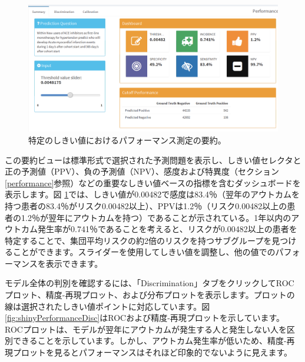 \documentclass[
  11pt]{book}
\theoremstyle{definition}
\theoremstyle{definition}
\theoremstyle{definition}
\theoremstyle{definition}
\theoremstyle{remark}
\begin{document}
\begin{figure}

{\centering \includegraphics[width=1\linewidth]{images/PatientLevelPrediction/shiny/shinyPerformanceSum} 

}

\caption{特定のしきい値におけるパフォーマンス測定の要約。}\label{fig:shinyPerformanceSum}
\end{figure}

この要約ビューは標準形式で選択された予測問題を表示し、しきい値セレクタと正の予測値（PPV）、負の予測値（NPV）、感度および特異度（セクション \ref{performance}参照）などの重要なしきい値ベースの指標を含むダッシュボードを表示します。図 \ref{fig:shinyPerformanceSum}では、しきい値が0.00482で感度は83.4％（翌年のアウトカムを持つ患者の83.4％がリスク0.00482以上）、PPVは1.2％（リスク0.00482以上の患者の1.2％が翌年にアウトカムを持つ）であることが示されている。1年以内のアウトカム発生率が0.741％であることを考えると、リスクが0.00482以上の患者を特定することで、集団平均リスクの約2倍のリスクを持つサブグループを見つけることができます。スライダーを使用してしきい値を調整し、他の値でのパフォーマンスを表示できます。

モデル全体の判別を確認するには、「Discrimination」タブをクリックしてROCプロット、精度-再現プロット、および分布プロットを表示します。プロットの線は選択されたしきい値ポイントに対応しています。図 \ref{fig:shinyPerformanceDisc}はROCおよび精度-再現プロットを示しています。ROCプロットは、モデルが翌年にアウトカムが発生する人と発生しない人を区別できることを示しています。しかし、アウトカム発生率が低いため、精度-再現プロットを見るとパフォーマンスはそれほど印象的でないように見えます。
\end{document}
